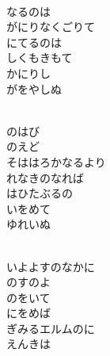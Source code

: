 \documentclass[10pt,b5j]{tarticle} %
\begin{document}
\vspace{1.5em} %
\newcommand{\linespace}{0.5em} %
\newcommand{\blocksize}{0.5\hsize} %
\newcommand{\itemmargin}{3em} %
\begin{enumerate} %
    \setlength{\itemindent}{\itemmargin} %
    \begin{minipage}[c]{\blocksize}
    
        \vspace{\linespace}
        \item~\\
        なるのは\\
        がにりなくごりて\\
        にてるのは\\
        しくもきもて\\
        かにりし\\
        がをやしぬ
        
    \end{minipage}
    \begin{minipage}[c]{\blocksize}
        
        \vspace{\linespace}
        \item~\\
        のはび\\
        のえど\\
        そははろかなるより\\
        れなきのなれば\\
        はひたぶるの\\
        いをめて\\
        ゆれいぬ
        
    \end{minipage}
    \begin{minipage}[c]{\blocksize}
        
        \vspace{\linespace}
        \item~\\
        いよよすのなかに\\
        のすのよ\\
        のをいて\\
        にをめば\\
        ぎみるエルムのに\\
        えんきは
        

\end{minipage}
\end{enumerate}
\end{document}
